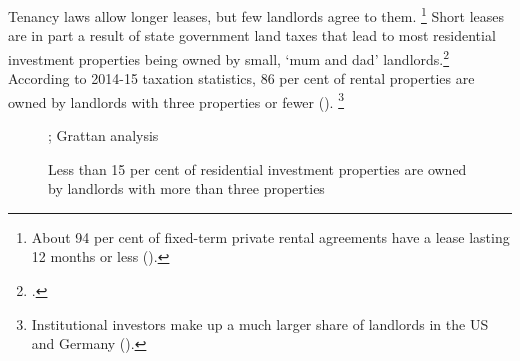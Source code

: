 Tenancy laws allow longer leases, but few landlords agree to them.%
	\footnote{About 94 per cent of fixed-term private rental agreements have a lease lasting 12 months or less (\textcite{Hulse-etal-2011-AHURI-Secure-occupancy-rental-housing}).}
Short leases are in part a result of state government land taxes that lead to most residential investment properties being owned by small, `mum and dad' landlords.\footcite{AHURI_2018_private_rental_housing_Martin_etal}
According to 2014-15 taxation statistics, 86 per cent of rental properties are owned by landlords with three properties or fewer ().%
	\footnote{Institutional investors make up a much larger share of landlords in the US and Germany (\textcites{Shaw-2014-theConvo-Renting-for-life}{Chong-2016-theOz-MacqGrey-align-rental-home-market}).}

\begin{figure}
\caption{Less than 15 per cent of residential investment properties are owned by landlords with more than three properties}\label{fig:rental-owenrship-numbers}
%
{\textcite{ATO-2017-Landlords-2006-to-2014}; Grattan analysis}
\end{figure}




